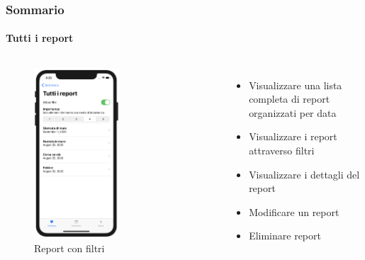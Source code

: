 \documentclass{beamer}
\begin{document}
\begin{frame}
\frametitle{Sommario}
\framesubtitle{Tutti i report}
\begin{columns}
	\begin{figure}[h]
        \includegraphics[width=0.55\textwidth]{../img/tutti3.png}
        \caption{Report con filtri}
   \end{figure}
   
  \begin{itemize}
	\item Visualizzare una lista completa di report organizzati per data
	\item Visualizzare i report attraverso filtri
	\item Visualizzare i dettagli del report
	\item Modificare un report
	\item Eliminare report
  \end{itemize}
\end{columns}
\end{frame}
\end{document}
